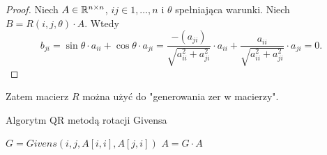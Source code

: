 \documentclass[12pt,a4paper]{report}
\newcommand{\mx}[1]{{#1}}
\begin{document}
\begin{proof}
Niech $\mx{A} \in \setR^{n \times n}$, $ij \in{1,\ldots,n}$ i $\theta$ spełniająca warunki. Niech $\mx{B} = \mx{R}(i,j,\theta)\cdot \mx{A}$. Wtedy 
$$
b_{ji}= \sin\theta\cdot a_{ii} + \cos\theta\cdot a_{ji} = \frac{-(a_{ji})}{\sqrt{a_{ii}^{2} + a_{ji}^{2}}} \cdot a_{ii} + \frac{a_{ii}}{\sqrt{a_{ii}^{2} + a_{ji}^{2}}} \cdot a_{ji} = 0.
$$
\end{proof}
Zatem macierz $R$ można użyć do "generowania zer w macierzy".
\begin{algorithm}
\caption{Algorytm QR metodą rotacji Givensa}
\begin{algorithmic}
		\State $\mx{G} = Givens(i,j, \mx{A}[i,i], \mx{A}[j,i])$
		\State $\mx{A} = \mx{G}\cdot \mx{A}$
	\EndFor	
\EndFor
\end{algorithmic}
\end{algorithm}
\end{document}
